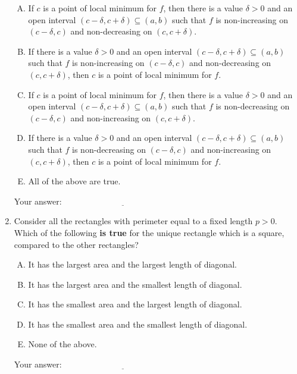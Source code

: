 \documentclass[10pt]{amsart}
\begin{document}
\begin{enumerate}
\begin{enumerate}[(A)]
  \item If $c$ is a point of local minimum for $f$, then there is a
    value $\delta > 0$ and an open interval $(c - \delta, c + \delta)
    \subseteq (a,b)$ such that $f$ is non-increasing on $(c -
    \delta,c)$ and non-decreasing on $(c,c+\delta)$.
  \item If there is a value $\delta > 0$ and an open interval $(c -
    \delta, c + \delta) \subseteq (a,b)$ such that $f$ is
    non-increasing on $(c - \delta,c)$ and non-decreasing on
    $(c,c+\delta)$, then $c$ is a point of local minimum for $f$.
  \item If $c$ is a point of local minimum for $f$, then there is a
    value $\delta > 0$ and an open interval $(c - \delta, c + \delta)
    \subseteq (a,b)$ such that $f$ is non-decreasing on $(c -
    \delta,c)$ and non-increasing on $(c,c+\delta)$.
  \item If there is a value $\delta > 0$ and an open interval $(c -
    \delta, c + \delta) \subseteq (a,b)$ such that $f$ is
    non-decreasing on $(c - \delta,c)$ and non-increasing on
    $(c,c+\delta)$, then $c$ is a point of local minimum for $f$.
  \item All of the above are true.
  \end{enumerate}

  \vspace{0.1in}
  Your answer: $\underline{\qquad\qquad\qquad\qquad\qquad\qquad\qquad}$
  \vspace{0.5in}

\item Consider all the rectangles with perimeter equal to a fixed
  length $p > 0$. Which of the following {\bf is true} for the unique
  rectangle which is a square, compared to the other rectangles?

  \begin{enumerate}[(A)]
  \item It has the largest area and the largest length of diagonal.
  \item It has the largest area and the smallest length of diagonal.
  \item It has the smallest area and the largest length of diagonal.
  \item It has the smallest area and the smallest length of diagonal.
  \item None of the above.
  \end{enumerate}

  \vspace{0.1in}
  Your answer: $\underline{\qquad\qquad\qquad\qquad\qquad\qquad\qquad}$
  \vspace{0.5in}


\end{enumerate}
\end{document}
